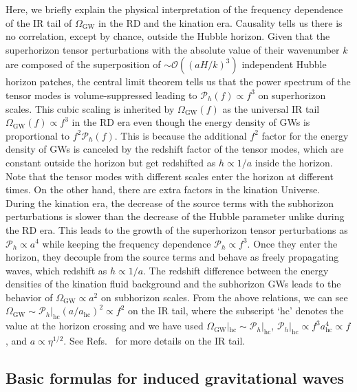 \documentclass[superscriptaddress, aps, preprintnumbers,
amsmath, amssymb, sort&compress, nofootinbib, 10pt, paper, floatfix]{revtex4-2}
\newcommand{\GW}{\text{GW}}
\begin{document}
Here, we briefly explain the physical interpretation of the frequency dependence of the IR tail of $\Omega_\GW$ in the RD and the kination era.
Causality tells us there is no correlation, except by chance, outside the Hubble horizon. 
Given that the superhorizon tensor perturbations with the absolute value of their wavenumber $k$ are composed of the superposition of $\sim \mathcal O((aH/k)^3)$ independent Hubble horizon patches,
the central limit theorem tells us that the power spectrum of the tensor modes is volume-suppressed leading to $\mathcal{P}_h(f) \propto f^3$ on superhorizon scales.  This cubic scaling is inherited by $\Omega_\text{GW}(f)$ as the universal IR tail $\Omega_\text{GW}(f) \propto f^3$ in the RD era even though the energy density of GWs is proportional to $f^2 \mathcal P_h(f)$. 
This is because the additional $f^2$ factor for the energy density of GWs is canceled by the redshift factor of the tensor modes, which are constant outside the horizon but get redshifted as $h \propto 1/a$ inside the horizon.
Note that the tensor modes with different scales enter the horizon at different times.
On the other hand, there are extra factors in the kination Universe. 
During the kination era, the decrease of the source terms with the subhorizon perturbations is slower than the decrease of the Hubble parameter unlike during the RD era. 
This leads to the growth of the superhorizon tensor perturbations as $\mathcal{P}_h \propto a^4$ while keeping the frequency dependence $\mathcal P_h \propto f^3$.
Once they enter the horizon, they decouple from the source terms and behave as freely propagating waves, which redshift as $h\propto 1/a$. 
The redshift difference between the energy densities of the kination fluid background and the subhorizon GWs leads to the behavior of $\Omega_\GW \propto a^2$ on subhorizon scales. 
From the above relations, we can see $\Omega_\GW \sim \mathcal P_h|_{\text{hc}} (a/a_\text{hc})^2 \propto f^2$ on the IR tail, where the subscript `hc' denotes the value at the horizon crossing and we have used $\Omega_\text{GW}|_\text{hc} \sim \mathcal P_h|_{\text{hc}}$, $\mathcal P_h|_{\text{hc}} \propto f^3 a_\text{hc}^4 \propto f$, and $a \propto \eta^{1/2}$.
See Refs.~\cite{Cai:2019cdl, Yuan:2019wwo, Domenech:2020kqm} for more details on the IR tail.  


\subsection{Basic formulas for induced gravitational waves}
\end{document}
